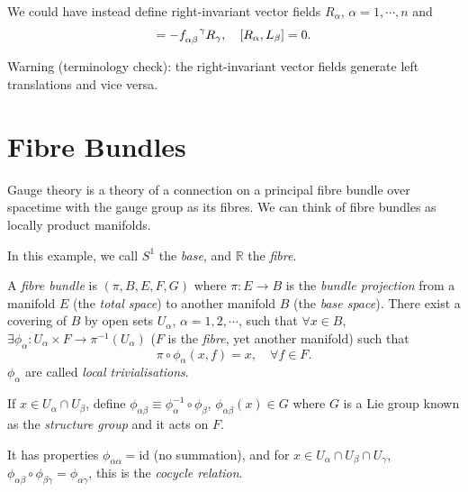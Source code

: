 \documentclass[a4paper,11pt]{article}
\begin{document}
    \begin{nt}
        We could have instead define right-invariant vector fields $R_\alpha$, $\alpha=1,\cdots,n$ and 
        \begin{equation}
            [R_\alpha, R_\beta] = - f\indices{_{\alpha \beta}^\gamma}R_\gamma, \quad [R_\alpha, L_\beta] = 0.
        \end{equation}

        Warning (terminology check): the right-invariant vector fields generate left translations and vice versa.
    \end{nt}

    \newpage
    \section{Fibre Bundles}

    Gauge theory is a theory of a connection on a principal fibre bundle over spacetime with the gauge group as its fibres. We can think of fibre bundles as locally product manifolds.


    In this example, we call $S^1$ the \emph{base}, and $\mathbb{R}$ the \emph{fibre}.

    \begin{defi}
        A \emph{fibre bundle} is $(\pi, B, E, F, G)$ where $\pi: E \to B$ is the \emph{bundle projection} from a manifold $E$ (the \emph{total space}) to another manifold $B$ (the \emph{base space}). There exist a covering of $B$ by open sets $U_\alpha$, $\alpha = 1,2,\cdots$, such that $\forall x \in B$, $\exists \phi_\alpha: U_\alpha \times F \to \pi^{-1}(U_\alpha)$ ($F$ is the \emph{fibre}, yet another manifold) such that 
        \begin{equation}
            \pi \circ \phi_\alpha(x,f) = x, \quad \forall f \in F.
        \end{equation}
        $\phi_\alpha$ are called \emph{local trivialisations}. 

        If $x \in U_\alpha \cap U_\beta$, define $\phi_{\alpha \beta} \equiv \phi_\alpha^{-1} \circ \phi_\beta$, $\phi_{\alpha \beta}(x) \in G$ where $G$ is a Lie group known as the \emph{structure group} and it acts on $F$.
        
        It has properties $\phi_{\alpha \alpha} = \text{id}$ (no summation), and for $x \in U_\alpha \cap U_\beta \cap U_\gamma$, $\phi_{\alpha \beta} \circ \phi_{\beta \gamma} = \phi_{\alpha \gamma}$, this is the \emph{cocycle relation}.
    \end{defi}
\end{document}
